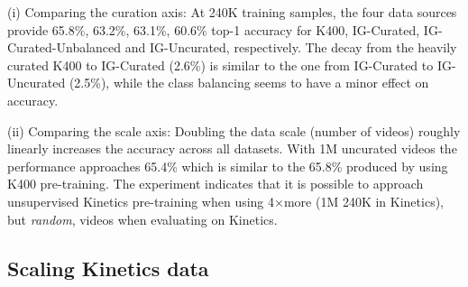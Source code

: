 \documentclass[final]{cvpr}
\def\x{$\times$}
\begin{document}
	(i) Comparing the curation axis: At 240K training samples, the four data sources provide 65.8\%, 63.2\%,	63.1\%, 60.6\% top-1 accuracy for K400, IG-Curated, IG-Curated-Unbalanced and IG-Uncurated, respectively. The decay from the heavily curated K400 to IG-Curated (2.6\%) is similar to the one from IG-Curated to IG-Uncurated (2.5\%), while the class balancing seems to have a minor effect on accuracy. 
	
	(ii) Comparing the scale axis: Doubling the data scale (number of videos) roughly linearly increases the accuracy across all datasets. With 1M uncurated videos the performance approaches 65.4\% which is similar to the 65.8\% produced by using K400 pre-training. The experiment indicates that it is possible to approach unsupervised Kinetics pre-training when using 4\x more (1M \vs 240K in Kinetics), but \textit{random}, videos when evaluating on Kinetics. 

	\subsection{Scaling Kinetics data}  \label{sec:extra_Kinetics}
\end{document}
